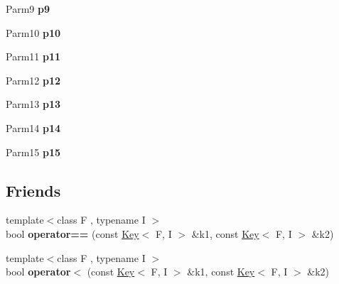 \begin{DoxyCompactItemize}
\item 
\hypertarget{classLoki_1_1Key_a933ce98969882c3ec862453387a6c633}{}Parm9 {\bfseries p9}\label{classLoki_1_1Key_a933ce98969882c3ec862453387a6c633}

\item 
\hypertarget{classLoki_1_1Key_ab864782b70c0beb09ba2c9dc4da9b456}{}Parm10 {\bfseries p10}\label{classLoki_1_1Key_ab864782b70c0beb09ba2c9dc4da9b456}

\item 
\hypertarget{classLoki_1_1Key_ad291cc5a149ba664ef6553aca1674187}{}Parm11 {\bfseries p11}\label{classLoki_1_1Key_ad291cc5a149ba664ef6553aca1674187}

\item 
\hypertarget{classLoki_1_1Key_a22d3cf586cf0df63f53b5bc78ece2b07}{}Parm12 {\bfseries p12}\label{classLoki_1_1Key_a22d3cf586cf0df63f53b5bc78ece2b07}

\item 
\hypertarget{classLoki_1_1Key_ac04cf1ca35e0524c351c8c41471cf990}{}Parm13 {\bfseries p13}\label{classLoki_1_1Key_ac04cf1ca35e0524c351c8c41471cf990}

\item 
\hypertarget{classLoki_1_1Key_aa2f05832ecdc610605bf8e7122c4d0ea}{}Parm14 {\bfseries p14}\label{classLoki_1_1Key_aa2f05832ecdc610605bf8e7122c4d0ea}

\item 
\hypertarget{classLoki_1_1Key_aa37b4905300f8da09be72cc69c66fb90}{}Parm15 {\bfseries p15}\label{classLoki_1_1Key_aa37b4905300f8da09be72cc69c66fb90}

\end{DoxyCompactItemize}
\subsection*{Friends}
\begin{DoxyCompactItemize}
\item 
\hypertarget{classLoki_1_1Key_a08ca3312dab858badf36e0fbd9e3f6ee}{}{\footnotesize template$<$class F , typename I $>$ }\\bool {\bfseries operator==} (const \hyperlink{classLoki_1_1Key}{Key}$<$ F, I $>$ \&k1, const \hyperlink{classLoki_1_1Key}{Key}$<$ F, I $>$ \&k2)\label{classLoki_1_1Key_a08ca3312dab858badf36e0fbd9e3f6ee}

\item 
\hypertarget{classLoki_1_1Key_a9423e3a932ad38aa7c604e8c0766e295}{}{\footnotesize template$<$class F , typename I $>$ }\\bool {\bfseries operator$<$} (const \hyperlink{classLoki_1_1Key}{Key}$<$ F, I $>$ \&k1, const \hyperlink{classLoki_1_1Key}{Key}$<$ F, I $>$ \&k2)\label{classLoki_1_1Key_a9423e3a932ad38aa7c604e8c0766e295}

\end{DoxyCompactItemize}


